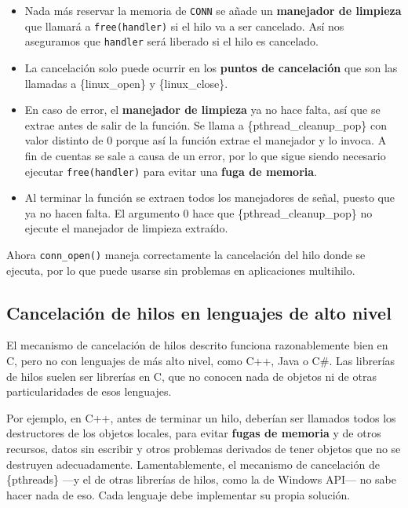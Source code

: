 \begin{itemize}
\item
  Nada más reservar la memoria de \texttt{CONN} se añade un
  \textbf{manejador de limpieza} que llamará a \texttt{free(handler)} si
  el hilo va a ser cancelado. Así nos aseguramos que \texttt{handler}
  será liberado si el hilo es cancelado.
\item
  La cancelación solo puede ocurrir en los \textbf{puntos de
  cancelación} que son las llamadas a \{linux\_open\} y
  \{linux\_close\}.
\item
  En caso de error, el \textbf{manejador de limpieza} ya no hace falta,
  así que se extrae antes de salir de la función. Se llama a
  \{pthread\_cleanup\_pop\} con valor distinto de 0 porque así la
  función extrae el manejador y lo invoca. A fin de cuentas se sale a
  causa de un error, por lo que sigue siendo necesario ejecutar
  \texttt{free(handler)} para evitar una \textbf{fuga de memoria}.
\item
  Al terminar la función se extraen todos los manejadores de señal,
  puesto que ya no hacen falta. El argumento 0 hace que
  \{pthread\_cleanup\_pop\} no ejecute el manejador de limpieza
  extraído.
\end{itemize}

Ahora \texttt{conn\_open()} maneja correctamente la cancelación del hilo
donde se ejecuta, por lo que puede usarse sin problemas en aplicaciones
multihilo.

\subsection{Cancelación de hilos en lenguajes de alto
nivel}\label{_cancelaciuxf3n_de_hilos_en_lenguajes_de_alto_nivel}

El mecanismo de cancelación de hilos descrito funciona razonablemente
bien en C, pero no con lenguajes de más alto nivel, como C++, Java o
C\#. Las librerías de hilos suelen ser librerías en C, que no conocen
nada de objetos ni de otras particularidades de esos lenguajes.

Por ejemplo, en C++, antes de terminar un hilo, deberían ser llamados
todos los destructores de los objetos locales, para evitar \textbf{fugas
de memoria} y de otros recursos, datos sin escribir y otros problemas
derivados de tener objetos que no se destruyen adecuadamente.
Lamentablemente, el mecanismo de cancelación de \{pthreads\} ---y el de
otras librerías de hilos, como la de Windows API--- no sabe hacer nada
de eso. Cada lenguaje debe implementar su propia solución.

